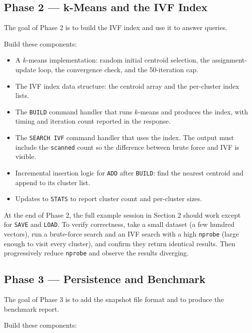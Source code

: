 \documentclass[11pt,a4paper]{article}
\begin{document}
\subsection{Phase 2 --- k-Means and the IVF Index}

The goal of Phase 2 is to build the IVF index and use it to answer queries.

Build these components:

\begin{itemize}
\item A $k$-means implementation: random initial centroid selection, the assignment-update loop, the convergence check, and the 50-iteration cap.
\item The IVF index data structure: the centroid array and the per-cluster index lists.
\item The \texttt{BUILD} command handler that runs $k$-means and produces the index, with timing and iteration count reported in the response.
\item The \texttt{SEARCH IVF} command handler that uses the index. The output must include the \texttt{scanned} count so the difference between brute force and IVF is visible.
\item Incremental insertion logic for \texttt{ADD} after \texttt{BUILD}: find the nearest centroid and append to its cluster list.
\item Updates to \texttt{STATS} to report cluster count and per-cluster sizes.
\end{itemize}

At the end of Phase 2, the full example session in Section 2 should work except for \texttt{SAVE} and \texttt{LOAD}. To verify correctness, take a small dataset (a few hundred vectors), run a brute-force search and an IVF search with a high \texttt{nprobe} (large enough to visit every cluster), and confirm they return identical results. Then progressively reduce \texttt{nprobe} and observe the results diverging.

\subsection{Phase 3 --- Persistence and Benchmark}

The goal of Phase 3 is to add the snapshot file format and to produce the benchmark report.

Build these components:
\end{document}
